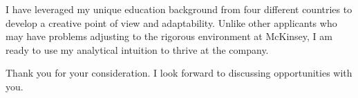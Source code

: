 \documentclass[11pt,a4paper,unicode]{moderncv}
\begin{document}
\vspace{3mm}
I have leveraged my unique education background from four different countries to develop a creative point of view and adaptability. Unlike other applicants who may have problems adjusting to the rigorous environment at McKinsey, I am ready to use my analytical intuition to thrive at the company. 

\vspace{3mm}
Thank you for your consideration. I look forward to discussing opportunities with you.

\vspace{3mm}
\makeletterclosing %
\end{document}
